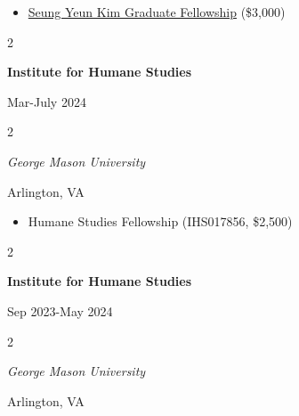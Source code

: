 \documentclass[
  16,
]{article}
\providecommand{\tightlist}{%
  \setlength{\itemsep}{0pt}\setlength{\parskip}{0pt}}
\begin{document}
\begin{itemize}
\tightlist
\item
  \href{https://sc.edu/study/colleges_schools/artsandsciences/walker_institute/research/student_scholarships_and_grants/index.php}{Seung Yeun Kim Graduate Fellowship}
  (\$3,000)
\end{itemize}

\vspace{7pt}

\begin{large}
  \begin{multicols}{2}
    \begin{flushleft}{\bf Institute for Humane Studies}\end{flushleft}
    \begin{flushright}Mar-July 2024\end{flushright}
  \end{multicols}
  \vspace{-0.17cm}
  \begin{multicols}{2}
    \begin{flushleft}\textit{George Mason University}\end
    {flushleft}\begin{flushright}Arlington, VA\end
    {flushright}
  \end{multicols}
\end{large}
\vspace{-0.16cm}

\begin{itemize}
\tightlist
\item
  Humane Studies Fellowship (IHS017856, \$2,500)
\end{itemize}

\begin{large}
  \begin{multicols}{2}
    \begin{flushleft}{\bf Institute for Humane Studies}\end{flushleft}
    \begin{flushright}Sep 2023-May 2024\end{flushright}
  \end{multicols}
  \vspace{-0.17cm}
  \begin{multicols}{2}
    \begin{flushleft}\textit{George Mason University}\end
    {flushleft}\begin{flushright}Arlington, VA\end
    {flushright}
  \end{multicols}
\end{large}
\vspace{-0.16cm}
\end{document}
